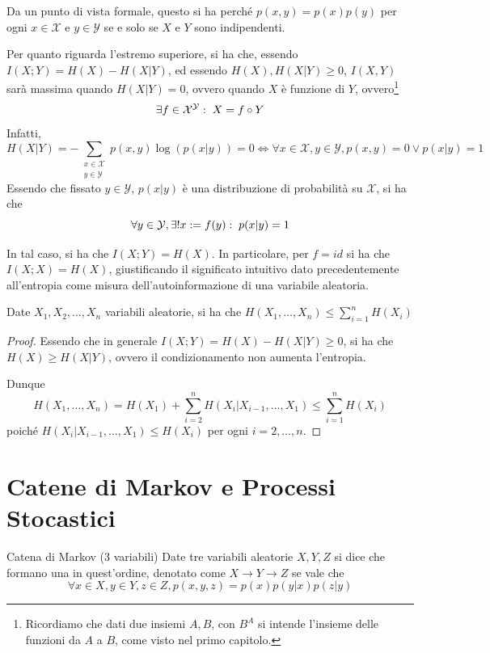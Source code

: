 Da un punto di vista formale, questo si ha perché \(p(x,y)=p(x)p(y)\) per ogni \(x \in \mathcal{X}\) e \(y \in \mathcal{Y}\) se e solo se \(X\) e \(Y\) sono indipendenti.

Per quanto riguarda l'estremo superiore, si ha che, essendo \(I(X;Y) = H(X) - H(X|Y)\), ed essendo \(H(X), H(X|Y) \geq 0\), \(I(X,Y)\) sarà massima quando \(H(X|Y) = 0\), ovvero quando \(X\) è funzione di \(Y\), ovvero\footnote{Ricordiamo che dati due insiemi \(A,B\), con \(B^A\) si intende l'insieme delle funzioni da \(A\) a \(B\), come visto nel primo capitolo.}
\[\exists f \in \mathcal{X}^\mathcal{Y} :\; X= f\circ Y\]
Infatti, 
\[H(X|Y) = -\sum_{\substack{x\in\mathcal{X}\\y\in\mathcal{Y}}}p(x,y)\log(p(x|y)) = 0 \iff \forall x \in \mathcal{X}, y \in \mathcal{Y}, p(x,y)=0\lor p(x|y)=1\]
Essendo che fissato \(y\in\mathcal{Y}\), \(p(x|y)\) è una distribuzione di probabilità su \(\mathcal{X}\), si ha che
\[\forall y \in \mathcal{Y}, \exists! x:=f(y):\; p(x|y)=1\]

In tal caso, si ha che \(I(X;Y) = H(X)\).
In particolare, per \(f = id\) si ha che \(I(X;X) = H(X)\), giustificando il significato intuitivo dato precedentemente all'entropia come misura dell'autoinformazione di una variabile aleatoria.

\begin{proposition}{}
  Date \(X_1, X_2, \ldots, X_n\) variabili aleatorie, si ha che
  \(H(X_1, \ldots, X_n)\leq \sum_{i=1}^n H(X_i)\)
\end{proposition}
\begin{proof}
  Essendo che in generale \(I(X;Y)= H(X) - H(X|Y) \geq 0\), si ha che \(H(X) \geq H(X|Y) \), ovvero il condizionamento non aumenta l'entropia.

  Dunque
  \[H(X_1, \ldots, X_n) = H(X_1) + \sum_{i=2}^{n}H(X_i|X_{i-1}, \ldots, X_1)\leq \sum_{i=1}^n H(X_i)\]
  poiché \(H(X_i|X_{i-1}, \ldots, X_1) \leq H(X_i)\) per ogni \(i=2,\ldots,n\).
\end{proof}

\section{Catene di Markov e Processi Stocastici}

\begin{definition}{Catena di Markov (3 variabili)}
  Date tre variabili aleatorie \(X, Y, Z\) si dice che formano una  in quest'ordine, denotato come \(X \to Y \to Z\) se vale che
  \[\forall x \in X, y \in Y, z \in Z, p(x,y,z) = p(x)p(y|x)p(z|y)\]
\end{definition}

